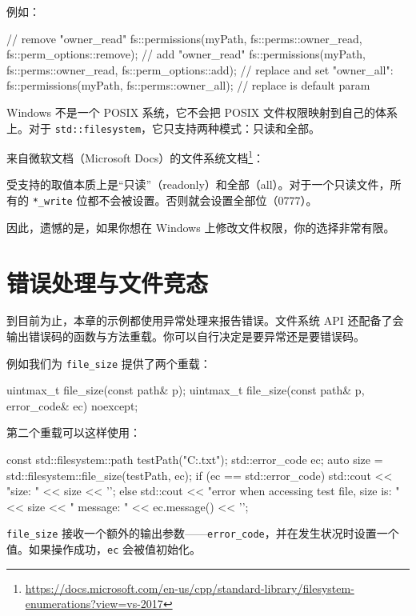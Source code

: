 例如：

\begin{codebox}[cpp]
// remove "owner_read"
fs::permissions(myPath, fs::perms::owner_read, fs::perm_options::remove);
// add "owner_read"
fs::permissions(myPath, fs::perms::owner_read, fs::perm_options::add);
// replace and set "owner_all":
fs::permissions(myPath, fs::perms::owner_all); // replace is default param
\end{codebox}


Windows 不是一个 POSIX 系统，它不会把 POSIX 文件权限映射到自己的体系上。对于 \texttt{std::filesystem}，它只支持两种模式：只读和全部。

来自微软文档（Microsoft Docs）的文件系统文档\footnote{\url{https://docs.microsoft.com/en-us/cpp/standard-library/filesystem-enumerations?view=vs-2017}}：

受支持的取值本质上是“只读”（readonly）和全部（all）。对于一个只读文件，所有的 \texttt{*\_write} 位都不会被设置。否则就会设置全部位（0777）。

因此，遗憾的是，如果你想在 Windows 上修改文件权限，你的选择非常有限。

\section{错误处理与文件竞态}

到目前为止，本章的示例都使用异常处理来报告错误。文件系统 API 还配备了会输出错误码的函数与方法重载。你可以自行决定是要异常还是要错误码。

例如我们为 \texttt{file\_size} 提供了两个重载：

\begin{codebox}[cpp]
uintmax_t file_size(const path& p);
uintmax_t file_size(const path& p, error_code& ec) noexcept;
\end{codebox}

第二个重载可以这样使用：

\begin{codebox}[cpp]
const std::filesystem::path testPath("C:\test.txt");
std::error_code ec{};
auto size = std::filesystem::file_size(testPath, ec);
if (ec == std::error_code{})
    std::cout << "size: " << size << '\n';
else
    std::cout << "error when accessing test file, size is: "
              << size << " message: " << ec.message() << '\n';
\end{codebox}

\texttt{file\_size} 接收一个额外的输出参数——\texttt{error\_code}，并在发生状况时设置一个值。如果操作成功，\texttt{ec} 会被值初始化。

